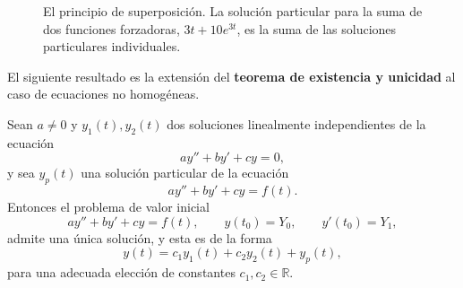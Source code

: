 \begin{figure}[h!]
    \centering
    \caption{El principio de superposici\'on. La soluci\'on particular para la suma de dos funciones forzadoras, $3t+10e^{3t}$, es la suma de las soluciones particulares individuales.}
    \label{fig:superposicion}
\end{figure}

El siguiente resultado es la extensi\'on del \textbf{teorema de existencia y unicidad} al caso de ecuaciones no homog\'eneas.

\begin{theorem}
    Sean $a\neq 0$ y $y_1(t),y_2(t)$ dos soluciones linealmente independientes de la ecuaci\'on
    \[
    ay''+by'+cy=0,
    \]
    y sea $y_p(t)$ una soluci\'on particular de la ecuaci\'on
    \[
    ay''+by'+cy=f(t).
    \]
    Entonces el problema de valor inicial
    \[
    ay''+by'+cy=f(t), \qquad y(t_0)=Y_0,\qquad y'(t_0)=Y_1,
    \]
    admite una \'unica soluci\'on, y esta es de la forma
    \[
    y(t)=c_1y_1(t)+c_2y_2(t)+y_p(t),
    \]
    para una adecuada elecci\'on de constantes $c_1,c_2\in \mathbb{R}$.
\end{theorem}

